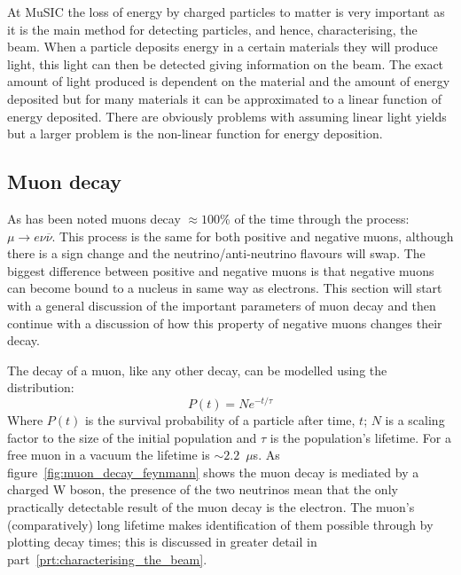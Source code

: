 At MuSIC the loss of energy by charged particles to matter is very important as it is the main method for detecting particles, and hence, characterising, the beam. When a particle deposits energy in a certain materials they will produce light, this light can then be detected giving information on the beam. The exact amount of light produced is dependent on the material and the amount of energy deposited but for many materials it can be approximated to a linear function of energy deposited. There are obviously problems with assuming linear light yields but a larger problem is the non-linear function for energy deposition. 

\subsection{Muon decay} %
\label{sec:muon_decay}
As has been noted muons decay \(\approx100\)\% of the time through the process: \( \mu \rightarrow e \nu \overline{\nu}  \). This process is the same for both positive and negative muons, although there is a sign change and the neutrino/anti-neutrino flavours will swap. The biggest difference between positive and negative muons is that negative muons can become bound to a nucleus in same way as electrons. This section will start with a general discussion of the important parameters of muon decay and then continue with a discussion of how this property of negative muons changes their decay.

The decay of a muon, like any other decay, can be modelled using the distribution:
\begin{equation}\label{eq:poisson}
  P(t) = Ne^{-t/\tau}
\end{equation}
Where \( P(t) \) is the survival probability of a particle after time, \( t \); \( N \) is a scaling factor to the size of the initial population and \( \tau \) is the population's lifetime. For a free muon in a vacuum the lifetime is \( \sim2.2\)~\( \mu \)s. As figure~\ref{fig:muon_decay_feynmann} shows the muon decay is mediated by a charged W boson, the presence of the two neutrinos mean that the only practically detectable result of the muon decay is the electron. The muon's (comparatively) long lifetime makes identification of them possible through by plotting decay times; this is discussed in greater detail in part~\ref{prt:characterising_the_beam}. 


